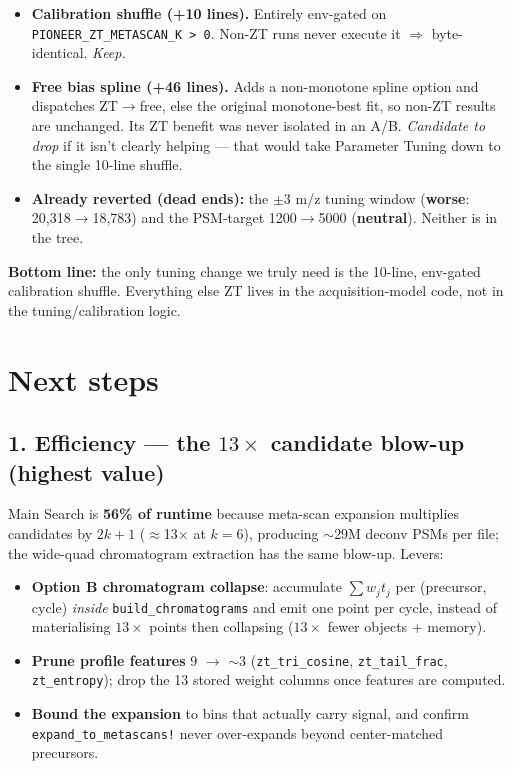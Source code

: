 \documentclass[11pt]{article}
\begin{document}
\begin{itemize}
\item \textbf{Calibration shuffle (+10 lines).} Entirely env-gated on
\texttt{PIONEER\_ZT\_METASCAN\_K > 0}. Non-ZT runs never execute it $\Rightarrow$
byte-identical. \emph{Keep.}
\item \textbf{Free bias spline (+46 lines).} Adds a non-monotone spline option and
dispatches ZT$\to$free, else the original monotone-best fit, so non-ZT results are
unchanged. Its ZT benefit was never isolated in an A/B. \emph{Candidate to drop} if
it isn't clearly helping --- that would take Parameter Tuning down to the single
10-line shuffle.
\item \textbf{Already reverted (dead ends):} the $\pm 3$ m/z tuning window
(\textbf{worse}: 20{,}318$\to$18{,}783) and the PSM-target 1200$\to$5000
(\textbf{neutral}). Neither is in the tree.
\end{itemize}

\noindent\textbf{Bottom line:} the only tuning change we truly need is the 10-line,
env-gated calibration shuffle. Everything else ZT lives in the acquisition-model
code, not in the tuning/calibration logic.

\section{Next steps}

\subsection{1. Efficiency --- the $13\times$ candidate blow-up (highest value)}

Main Search is \textbf{56\% of runtime} because meta-scan expansion multiplies
candidates by $2k{+}1$ ($\approx$13$\times$ at $k{=}6$), producing $\sim$29M deconv
PSMs per file; the wide-quad chromatogram extraction has the same blow-up. Levers:
\begin{itemize}
\item \textbf{Option B chromatogram collapse}: accumulate $\sum w_j t_j$ per
(precursor, cycle) \emph{inside} \texttt{build\_chromatograms} and emit one point
per cycle, instead of materialising $13\times$ points then collapsing
($13\times$ fewer objects + memory).
\item \textbf{Prune profile features} 9 $\to$ $\sim$3 (\texttt{zt\_tri\_cosine},
\texttt{zt\_tail\_frac}, \texttt{zt\_entropy}); drop the 13 stored weight columns
once features are computed.
\item \textbf{Bound the expansion} to bins that actually carry signal, and confirm
\texttt{expand\_to\_metascans!} never over-expands beyond center-matched precursors.
\end{itemize}
\end{document}
